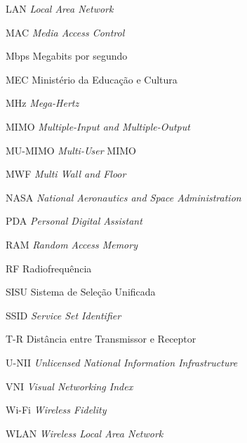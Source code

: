 \begin{siglas}
	\item[LAN] \hspace{.8cm} \textit{Local Area Network}
	\item[MAC] \hspace{.8cm} \textit{Media Access Control}
	\item[Mbps] \hspace{.8cm} Megabits por segundo
	\item[MEC] \hspace{.8cm} Ministério da Educação e Cultura
	\item[MHz] \hspace{.8cm} \textit{Mega-Hertz}
	\item[MIMO] \hspace{.8cm} \textit{Multiple-Input and Multiple-Output}
	\item[MU-MIMO] \hspace{.8cm} \textit{Multi-User} MIMO
	\item[MWF] \hspace{.8cm} \textit{Multi Wall and Floor}
	\item[NASA] \hspace{.8cm} \textit{National Aeronautics and Space Administration}
	\item[PDA] \hspace{.8cm} \textit{Personal Digital Assistant}
	\item[RAM] \hspace{.8cm} \textit{Random Access Memory}
	\item[RF] \hspace{.8cm} Radiofrequência
	\item[SISU] \hspace{.8cm} Sistema de Seleção Unificada
	\item[SSID] \hspace{.8cm} \textit{Service Set Identifier}
	\item[T-R] \hspace{.8cm} Distância entre Transmissor e Receptor
	\item[U-NII] \hspace{.8cm} \textit{Unlicensed National Information Infrastructure}
	\item[VNI] \hspace{.8cm} \textit{Visual Networking Index}
	\item[Wi-Fi] \hspace{.8cm} \textit{Wireless Fidelity}
	\item[WLAN] \hspace{.8cm} \textit{Wireless Local Area Network}
\end{siglas}